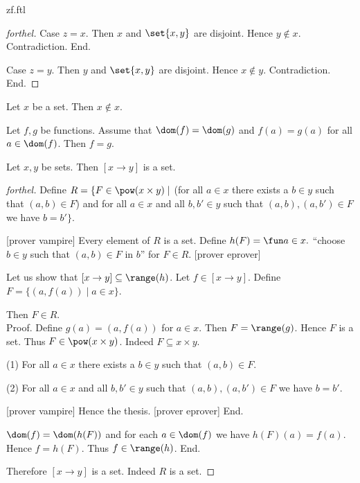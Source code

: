 \documentclass{naproche-library}
\begin{document}
\begin{smodule}{zf.ftl}
\begin{proof}[forthel]
    Case $z = x$.
      Then $x$ and $\set{x,y}$ are disjoint.
      Hence $y \notin x$.
      Contradiction.
    End.

    Case $z = y$.
      Then $y$ and $\set{x,y}$ are disjoint.
      Hence $x \notin y$.
      Contradiction.
    End.
  \end{proof}

  \begin{corollary}[forthel,id=FOUNDATIONS_10_3086917813927936,printid]
    Let $x$ be a set.
    Then $x \notin x$.
  \end{corollary}

  \begin{proposition}[forthel,id=FOUNDATIONS_10_4589652321021547,printid]
    Let $f, g$ be functions.
    Assume that $\dom(f) = \dom(g)$ and $f(a) = g(a)$ for all $a \in \dom(f)$.
    Then $f = g$.
  \end{proposition}

  \begin{proposition}[forthel,id=FOUNDATIONS_10_4105036244189184,printid]
    Let $x, y$ be sets.
    Then $[x \to y]$ is a set.
  \end{proposition}
  \begin{proof}[forthel]
    Define $R = \{ F \in \pow(x \times y) \mid$ (for all $a \in x$ there exists a $b \in y$ such that $(a,b) \in F$) and for all $a \in x$ and all $b, b' \in y$ such that $(a,b), (a,b') \in F$ we have $b = b' \}$.

    [prover vampire]
    Every element of $R$ is a set. %
    Define $h(F) = \fun a \in x.$ ``choose $b \in y$ such that $(a,b) \in F$ in $b$'' for $F \in R$.
    [prover eprover]

    Let us show that $[x \to y] \subseteq \range(h)$.
      Let $f \in [x \to y]$.
      Define $F = \{ (a,f(a)) \mid a \in x \}$.

      Then $F \in R$. \\
      Proof.
        Define $g(a) = (a,f(a))$ for $a \in x$.
        Then $F = \range(g)$.
        Hence $F$ is a set.
        Thus $F \in \pow(x \times y)$.
        Indeed $F \subseteq x \times y$.

        (1) For all $a \in x$ there exists a $b \in y$ such that $(a,b) \in F$.

        (2) For all $a \in x$ and all $b, b' \in y$ such that $(a,b),
        (a,b') \in F$ we have $b = b'$.

        [prover vampire]
        Hence the thesis.
        [prover eprover]
      End.

      $\dom(f) = \dom(h(F))$ and for each $a \in \dom(f)$ we have $h(F)(a) = f(a)$.
      Hence $f = h(F)$.
      Thus $f \in \range(h)$.
    End.

    Therefore $[x \to y]$ is a set.
    Indeed $R$ is a set.
  \end{proof}
\end{smodule}
\end{document}
